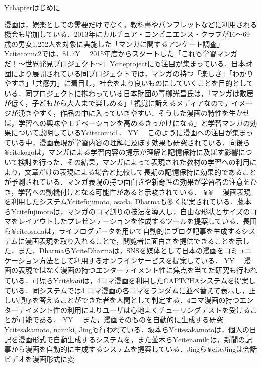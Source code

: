 ¥chapter{はじめに}

漫画は，娯楽としての需要だけでなく，教科書やパンフレットなどに利用される機会も増加している．2013年にカルチュア・コンビニエンス・クラブが16〜69 歳の男女1,252人を対象に実施した「マンガに関するアンケート調査」¥cite{comic2}では，81.7¥%
　2015年度からスタートした「これも学習マンガだ！〜世界発見プロジェクト〜」¥cite{project}にも注目が集まっている．日本財団により展開されている同プロジェクトでは，マンガの持つ「楽しさ」「わかりやすさ」「共感力」に着目し，社会をより良いものにしていくことを目的としている．同プロジェクトに携わっている日本財団の青柳光昌氏は，「マンガは敷居が低く，子どもから大人まで楽しめる」「視覚に訴えるメディアなので，イメージが湧きやすく，作品の中に入っていきやすい．そうした漫画の特性を生かせば，学習への興味やモチベーションを高めるきっかけになる」と学習マンガの効果について説明している¥cite{comic1}．
¥¥
　このように漫画への注目が集まっている中，漫画表現が学習内容の理解に及ぼす効果も研究されている．向後ら¥cite{kogo}は，マンガによる学習内容の提示が理解と記憶保持に及ぼす影響について検討を行った．その結果，マンガによって表現された教材の学習への利用により，文章だけの表現による場合と比較して長期の記憶保持に効果的であることが予測されている．マンガ表現の持つ面白さや新奇性の効果が学習者の注意をひき，学習への動機付けとなる可能性があると示唆されている．
¥¥
　漫画表現を利用したシステム¥cite{fujimoto, osada, Dharma}も多く提案されている．藤本ら¥cite{fujimoto}は，マンガのコマ割りの技法を導入し，自由な形状とサイズのコマをレイアウトしたプレゼンテーションを作成するツールを提案している．長田ら¥cite{osada}は，ライフログデータを用いて自動的にブログ記事を生成するシステムに漫画表現を取り入れることで，閲覧者に面白さを提供できることを示した．また，Dharmaら¥cite{Dharma}は，SNSを媒体として日本の漫画をコミュニケーション方法として利用するオンラインサービスを提案している．
¥¥
　漫画の表現ではなく漫画の持つエンターテイメント性に焦点を当てた研究も行われている．可児ら¥cite{kani}は，4コマ漫画を利用したCAPTCHAシステムを提案している．同システムでは4 コマ漫画の各コマをランダムに並べ替えて表示し，正しい順序を答えることができた者を人間として判定する．4コマ漫画の持つエンターテイメント性の利用によりユーザは心地よくチューリングテストを受けることが可能である．
¥¥
　また，漫画そのものを自動的に生成する研究¥cite{sakamoto, namiki, Jing}も行われている．坂本ら¥cite{sakamoto}は，個人の日記を漫画形式で自動生成するシステムを，また並木ら¥cite{namiki}は，新聞の記事から漫画を自動的に生成するシステムを提案している．Jingら¥cite{Jing}は会話ビデオを漫画形式に変
